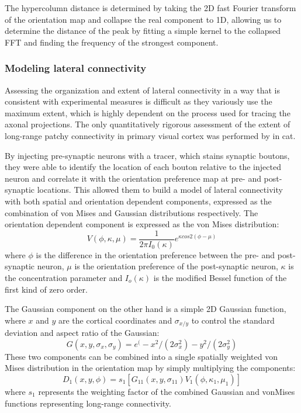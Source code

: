 The hypercolumn distance is determined by taking the 2D fast Fourier
transform of the orientation map and collapse the real component to
1D, allowing us to determine the distance of the peak by fitting a
simple kernel to the collapsed FFT and finding the frequency of the
strongest component.

\subsubsection*{Modeling lateral connectivity} \label{BuzasEquations}

Assessing the organization and extent of lateral connectivity in a way
that is consistent with experimental measures is difficult as they
variously use the maximum extent, which is highly dependent on the
process used for tracing the axonal projections. The only quantitatively
rigorous assessment of the extent of long-range patchy connectivity in
primary visual cortex was performed by \cite{Buzas2006} in cat.

By injecting pre-synaptic neurons with a tracer, which stains synaptic
boutons, they were able to identify the location of each bouton
relative to the injected neuron and correlate it with the orientation
preference map at pre- and post-synaptic locations. This allowed them
to build a model of lateral connectivity with both spatial and
orientation dependent components, expressed as the combination of von
Mises and Gaussian distributions respectively. The orientation
dependent component is expressed as the von Mises distribution:
\begin{equation}
V(\phi, \kappa, \mu) = \frac{1}{2 \pi I_0(\kappa)} e^{\kappa cos 2(\phi - \mu)}
\end{equation}
where $\phi$ is the difference in the orientation preference between
the pre- and post-synaptic neuron, $\mu$ is the orientation preference
of the post-synaptic neuron, $\kappa$ is the concentration parameter
and $I_o(\kappa)$ is the modified Bessel function of the first kind of
zero order.

The Gaussian component on the other hand is a simple 2D Gaussian
function, where $x$ and $y$ are the cortical coordinates and $\sigma_{x/y}$
to control the standard deviation and aspect ratio of the Gaussian:
\begin{equation}
G(x, y, \sigma_x, \sigma_y) = e^(-x^2/(2\sigma_x^2) - y^2/(2\sigma_y^2)
\end{equation}
These two components can be combined into a single spatially weighted
von Mises distribution in the orientation map by simply multiplying the
components:
\begin{equation}
D_1(x, y, \phi) = s_1 [G_{11}(x, y, \sigma_{11}) V_1(\phi, \kappa_1, \mu_1)]
\end{equation}
where $s_1$ represents the weighting factor of the combined Gaussian
and vonMises functions representing long-range connectivity.

